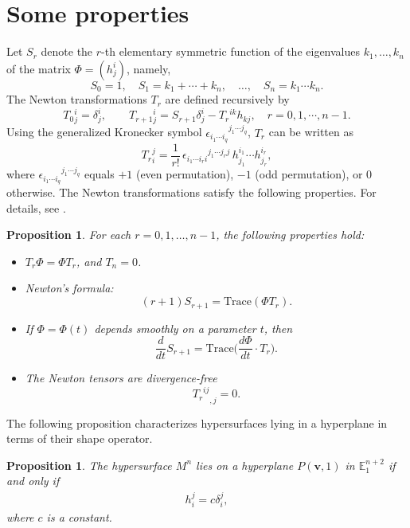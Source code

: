 \documentclass[reqno,11pt, letterpaper]{amsart}
\def\E{{\mathbb E}}
\theoremstyle{plain}
\newtheorem{prop}[thm]{Proposition}
\theoremstyle{definition}
\numberwithin{equation}{section}
\begin{document}
\section{Some properties}\label{sec-prop}
Let $S_r$ denote the $r$-th elementary symmetric function of the eigenvalues $k_1,\dots,k_n$ of the matrix $\Phi=(h^i_j)$, namely,
\[
S_0=1,\quad S_1=k_1+\cdots+k_n,\quad \dots,\quad S_n=k_1\cdots k_n.
\]
The Newton transformations $T_r$ are defined recursively by
\[
T_0{}^i_j=\delta^i_j,\qquad
T_{r+1}{}^i_j = S_{r+1}\delta^i_j - T_r{}^{ik} h_{kj},\quad r=0,1,\cdots,n-1.
\]
Using the generalized Kronecker symbol ${\epsilon_{i_1\cdots i_q}}^{j_1\cdots j_q}$, 
$T_r$ can be written as
\[
{T_r}^j_i = \frac{1}{r!}\,{\epsilon_{i_1\cdots i_ri}}^{j_1\cdots j_rj}\,
h_{j_1}^{i_1}\cdots h_{j_r}^{i_r},
\]
where ${\epsilon_{i_1\cdots i_q}}^{j_1\cdots j_q}$ equals $+1$ (even permutation), $-1$ (odd permutation), or $0$ otherwise.
The Newton transformations satisfy the following properties. For details, see \cite{rei}.
\begin{prop}\label{N prop}
	For each $r = 0, 1, \dots, n-1$, the following properties hold:
	\begin{itemize}[left=12pt, labelsep=5pt, itemsep=-4pt]
		\item[$\mathrm{(i)}$] $T_r \Phi = \Phi T_r$, and $T_n = 0$.\\
		\item[$\mathrm{(ii)}$] \emph{Newton's formula:}
		\[
		(r+1) S_{r+1} = \mathrm{Trace}(\Phi T_r).
		\]
		\item[$\mathrm{(iii)}$] If $\Phi = \Phi(t)$ depends smoothly on a parameter $t$, then
		\[
		\frac{d}{dt} S_{r+1} = \mathrm{Trace}\Big(\frac{d\Phi}{dt} \cdot T_r\Big).
		\]
		\item[$\mathrm{(iv)}$] The Newton tensors are divergence-free
		\[
		{{T_r}^{ij}}_{,j} = 0.
		\]
	\end{itemize}
\end{prop}
The following proposition characterizes hypersurfaces lying in a hyperplane in terms of their shape operator.
\begin{prop}\label{prop-plane}
	The hypersurface $M^n$ lies on a hyperplane $P(\mathbf{v},1)$ in $\E^{n+2}_1$ if and only if
	\begin{align*}
		h^j_i=c\delta^j_i,
	\end{align*}
	where $c$ is a constant.
\end{prop}
\end{document}
